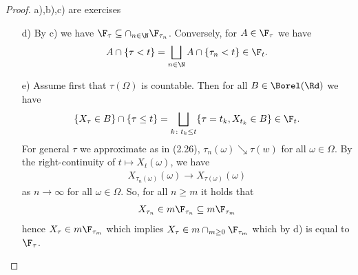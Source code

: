 \begin{proof}
a),b),c) are exercises
\begin{itemize}
\item[d)] By c) we have $\F_\tau\subseteq \cap_{n\in \N} \F_{\tau_n}$.
Conversely, for $A \in \F_\tau$ we have
\begin{align*}
A \cap \{\tau<t\}=\bigsqcup_{n\in \N} A \cap \{\tau_n<t\} \in \F_t.
\end{align*}
\item[e)]
Assume first that $\tau(\Omega)$ is countable.
Then for all $B \in \Borel(\Rd)$ we have
\begin{align*}
\{X_\tau \in B\}\cap \{\tau\leq t\}=\bigsqcup_{k \colon t_k \leq t} \{\tau=t_k,X_{t_k}\in B\} \in \F_t.
\end{align*}
For general $\tau$ we approximate as in (2.26), \ie
$\tau_n(\omega)\searrow \tau(w)$ for all $\omega \in \Omega$.
By the right-continuity of $t \mapsto X_t(\omega)$, we have
\begin{align*}
X_{\tau_n(\omega)}(\omega)\to X_{\tau(\omega)}(\omega)
\end{align*}
as $n\to \infty$ for all $\omega \in \Omega$.
So, for all $n\geq m$ it holds that
\begin{align*}
X_{\tau_n} \in m \F_{\tau_n}\subseteq m \F_{\tau_m}
\end{align*}
hence $X_\tau \in m \F_{\tau_m}$ which implies $X_\tau \in m \cap_{m\geq 0} \F_{\tau_m}$ which by d) is equal to $\F_\tau$.
\end{itemize}
\end{proof}

